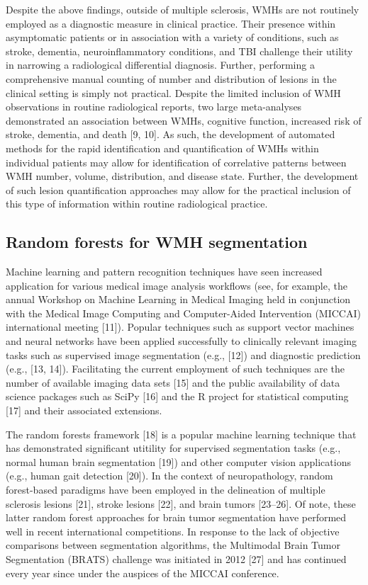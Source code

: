 \documentclass[11pt,]{article}
\begin{document}
Despite the above findings, outside of multiple sclerosis, WMHs are not
routinely employed as a diagnostic measure in clinical practice. Their
presence within asymptomatic patients or in association with a variety
of conditions, such as stroke, dementia, neuroinflammatory conditions,
and TBI challenge their utility in narrowing a radiological differential
diagnosis. Further, performing a comprehensive manual counting of number
and distribution of lesions in the clinical setting is simply not
practical. Despite the limited inclusion of WMH observations in routine
radiological reports, two large meta-analyses demonstrated an
association between WMHs, cognitive function, increased risk of stroke,
dementia, and death {[}9, 10{]}. As such, the development of automated
methods for the rapid identification and quantification of WMHs within
individual patients may allow for identification of correlative patterns
between WMH number, volume, distribution, and disease state. Further,
the development of such lesion quantification approaches may allow for
the practical inclusion of this type of information within routine
radiological practice.

\subsection{Random forests for WMH
segmentation}\label{random-forests-for-wmh-segmentation}

Machine learning and pattern recognition techniques have seen increased
application for various medical image analysis workflows (see, for
example, the annual Workshop on Machine Learning in Medical Imaging held
in conjunction with the Medical Image Computing and Computer-Aided
Intervention (MICCAI) international meeting {[}11{]}). Popular
techniques such as support vector machines and neural networks have been
applied successfully to clinically relevant imaging tasks such as
supervised image segmentation (e.g., {[}12{]}) and diagnostic prediction
(e.g., {[}13, 14{]}). Facilitating the current employment of such
techniques are the number of available imaging data sets {[}15{]} and
the public availability of data science packages such as SciPy {[}16{]}
and the R project for statistical computing {[}17{]} and their
associated extensions.

The random forests framework {[}18{]} is a popular machine learning
technique that has demonstrated significant utitility for supervised
segmentation tasks (e.g., normal human brain segmentation {[}19{]}) and
other computer vision applications (e.g., human gait detection
{[}20{]}). In the context of neuropathology, random forest-based
paradigms have been employed in the delineation of multiple sclerosis
lesions {[}21{]}, stroke lesions {[}22{]}, and brain tumors
{[}23--26{]}. Of note, these latter random forest approaches for brain
tumor segmentation have performed well in recent international
competitions. In response to the lack of objective comparisons between
segmentation algorithms, the Multimodal Brain Tumor Segmentation (BRATS)
challenge was initiated in 2012 {[}27{]} and has continued every year
since under the auspices of the MICCAI conference.
\end{document}
